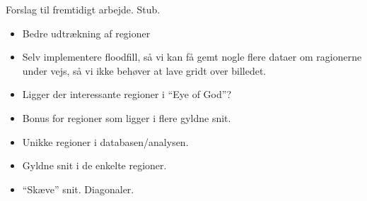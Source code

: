 {
{\sffamily Forslag til fremtidigt arbejde. Stub.
}

\begin{itemize}
    \item Bedre udtrækning af regioner
    \item Selv implementere floodfill, så vi kan få gemt nogle flere
    dataer om ragionerne under vejs, så vi ikke behøver at lave gridt
    over billedet.
    \item Ligger der interessante regioner i ``Eye of God''?
    \item Bonus for regioner som ligger i flere gyldne snit.
    \item Unikke regioner i databasen/analysen.
    \item Gyldne snit i de enkelte regioner.
    \item ``Skæve'' snit. Diagonaler.
\end{itemize}

%
}

